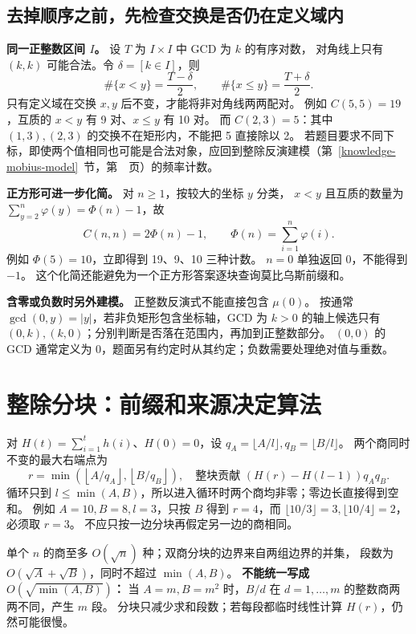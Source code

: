 \subsection{去掉顺序之前，先检查交换是否仍在定义域内}
\textbf{同一正整数区间 $I$。} 设 $T$ 为 $I\times I$ 中 GCD 为 $k$ 的有序对数，
对角线上只有 $(k,k)$ 可能合法。令 $\delta=[k\in I]$，则
\[
\#\{x<y\}=\frac{T-\delta}{2},\qquad
\#\{x\le y\}=\frac{T+\delta}{2}.
\]
只有定义域在交换 $x,y$ 后不变，才能将非对角线两两配对。
例如 $C(5,5)=19$，互质的 $x<y$ 有 9 对、$x\le y$ 有 10 对。
而 $C(2,3)=5$：其中 $(1,3),(2,3)$ 的交换不在矩形内，不能把 5 直接除以 2。
若题目要求不同下标，即使两个值相同也可能是合法对象，应回到整除反演建模（第~\ref{knowledge-mobius-model}~节，第~\pageref{knowledge-mobius-model}~页）的频率计数。

\textbf{正方形可进一步化简。} 对 $n\ge1$，按较大的坐标 $y$ 分类，
$x<y$ 且互质的数量为 $\sum_{y=2}^n\varphi(y)=\Phi(n)-1$，故
\[
C(n,n)=2\Phi(n)-1,\qquad \Phi(n)=\sum_{i=1}^n\varphi(i).
\]
例如 $\Phi(5)=10$，立即得到 19、9、10 三种计数。
$n=0$ 单独返回 0，不能得到 $-1$。
这个化简还能避免为一个正方形答案逐块查询莫比乌斯前缀和。

\textbf{含零或负数时另外建模。} 正整数反演式不能直接包含 $\mu(0)$。
按通常 $\gcd(0,y)=|y|$，若非负矩形包含坐标轴，GCD 为 $k>0$ 的轴上候选只有
$(0,k),(k,0)$；分别判断是否落在范围内，再加到正整数部分。
$(0,0)$ 的 GCD 通常定义为 0，题面另有约定时从其约定；负数需要处理绝对值与重数。

\section{整除分块：前缀和来源决定算法}\label{knowledge-quotient-choice}
对 $H(t)=\sum_{i=1}^th(i)$、$H(0)=0$，设
$q_A=\lfloor A/l\rfloor,q_B=\lfloor B/l\rfloor$。
两个商同时不变的最大右端点为
\[
r=\min\!\left(\left\lfloor A/q_A\right\rfloor,
                 \left\lfloor B/q_B\right\rfloor\right),
\quad\text{整块贡献 }(H(r)-H(l-1))q_Aq_B.
\]
循环只到 $l\le\min(A,B)$，所以进入循环时两个商均非零；零边长直接得到空和。
例如 $A=10,B=8,l=3$，只按 $B$ 得到 $r=4$，而 $\lfloor10/3\rfloor=3,\lfloor10/4\rfloor=2$，必须取 $r=3$。
不应只按一边分块再假定另一边的商相同。

单个 $n$ 的商至多 $O(\sqrt n)$ 种；双商分块的边界来自两组边界的并集，
段数为 $O(\sqrt A+\sqrt B)$，同时不超过 $\min(A,B)$。
\textbf{不能统一写成 $O(\sqrt{\min(A,B)})$：}
当 $A=m,B=m^2$ 时，$B/d$ 在 $d=1,\ldots,m$ 的整数商两两不同，产生 $m$ 段。
分块只减少求和段数；若每段都临时线性计算 $H(r)$，仍然可能很慢。

